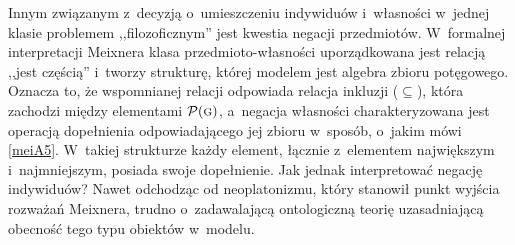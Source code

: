 Innym związanym z~decyzją o~umieszczeniu indywiduów i~własności w~jednej klasie problemem ,,filozoficznym'' jest kwestia negacji przedmiotów. W~formalnej interpretacji Meixnera klasa przedmioto-własności uporządkowana jest relacją ,,jest częścią'' i~tworzy strukturę, której modelem jest algebra zbioru potęgowego. Oznacza to, że wspomnianej relacji odpowiada relacja inkluzji ($\subseteq$), która zachodzi między elementami $\mathcal{P}(\textsc{g})$, a~negacja własności charakteryzowana jest operacją dopełnienia odpowiadającego jej zbioru w~sposób, o~jakim mówi \eqref{meiA5}. W~takiej strukturze każdy element, łącznie z~elementem największym i~najmniejszym, posiada swoje dopełnienie. Jak jednak interpretować negację indywiduów? Nawet odchodząc od neoplatonizmu, który stanowił punkt wyjścia rozważań Meixnera, trudno o~zadawalającą ontologiczną teorię uzasadniającą obecność tego typu obiektów w~modelu.

